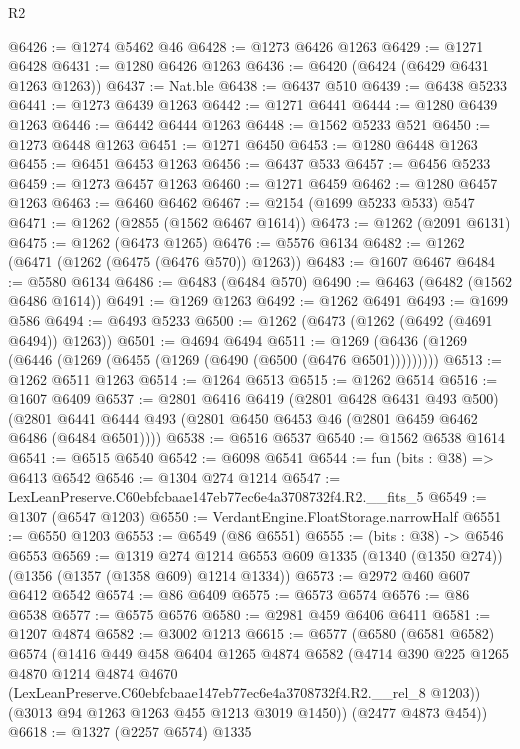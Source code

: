 \begin{lexlean}{R2}
\begin{coremodule}
@6426 := @1274 @5462 @46
@6428 := @1273 @6426 @1263
@6429 := @1271 @6428
@6431 := @1280 @6426 @1263
@6436 := @6420 (@6424 (@6429 @6431 @1263 @1263))
@6437 := Nat.ble
@6438 := @6437 @510
@6439 := @6438 @5233
@6441 := @1273 @6439 @1263
@6442 := @1271 @6441
@6444 := @1280 @6439 @1263
@6446 := @6442 @6444 @1263
@6448 := @1562 @5233 @521
@6450 := @1273 @6448 @1263
@6451 := @1271 @6450
@6453 := @1280 @6448 @1263
@6455 := @6451 @6453 @1263
@6456 := @6437 @533
@6457 := @6456 @5233
@6459 := @1273 @6457 @1263
@6460 := @1271 @6459
@6462 := @1280 @6457 @1263
@6463 := @6460 @6462
@6467 := @2154 (@1699 @5233 @533) @547
@6471 := @1262 (@2855 (@1562 @6467 @1614))
@6473 := @1262 (@2091 @6131)
@6475 := @1262 (@6473 @1265)
@6476 := @5576 @6134
@6482 := @1262 (@6471 (@1262 (@6475 (@6476 @570)) @1263))
@6483 := @1607 @6467
@6484 := @5580 @6134
@6486 := @6483 (@6484 @570)
@6490 := @6463 (@6482 (@1562 @6486 @1614))
@6491 := @1269 @1263
@6492 := @1262 @6491
@6493 := @1699 @586
@6494 := @6493 @5233
@6500 := @1262 (@6473 (@1262 (@6492 (@4691 @6494)) @1263))
@6501 := @4694 @6494
@6511 := @1269 (@6436 (@1269 (@6446 (@1269 (@6455 (@1269 (@6490 (@6500 (@6476 @6501)))))))))
@6513 := @1262 @6511 @1263
@6514 := @1264 @6513
@6515 := @1262 @6514
@6516 := @1607 @6409
@6537 := @2801
    @6416
    @6419
    (@2801 @6428 @6431 @493 @500)
    (@2801 @6441 @6444 @493 (@2801 @6450 @6453 @46 (@2801 @6459 @6462 @6486 (@6484 @6501))))
@6538 := @6516 @6537
@6540 := @1562 @6538 @1614
@6541 := @6515 @6540
@6542 := @6098 @6541
@6544 := fun (bits : @38) => @6413 @6542
@6546 := @1304 @274 @1214
@6547 := LexLeanPreserve.C60ebfcbaae147eb77ec6e4a3708732f4.R2.__fits_5
@6549 := @1307 (@6547 @1203)
@6550 := VerdantEngine.FloatStorage.narrowHalf
@6551 := @6550 @1203
@6553 := @6549 (@86 @6551)
@6555 := (bits : @38) -> @6546 @6553
@6569 := @1319
    @274
    @1214
    @6553
    @609
    @1335
    (@1340 (@1350 @274))
    (@1356 (@1357 (@1358 @609) @1214 @1334))
@6573 := @2972 @460 @607 @6412 @6542
@6574 := @86 @6409
@6575 := @6573 @6574
@6576 := @86 @6538
@6577 := @6575 @6576
@6580 := @2981 @459 @6406 @6411
@6581 := @1207 @4874
@6582 := @3002 @1213
@6615 := @6577
    (@6580
      (@6581 @6582)
      @6574
      (@1416
        @449
        @458
        @6404
        @1265
        @4874
        @6582
        (@4714
          @390
          @225
          @1265
          @4870
          @1214
          @4874
          @4670
          (LexLeanPreserve.C60ebfcbaae147eb77ec6e4a3708732f4.R2.__rel_8 @1203))
        (@3013 @94 @1263 @1263 @455 @1213 @3019 @1450))
      (@2477 @4873 @454))
@6618 := @1327 (@2257 @6574) @1335

\end{coremodule}
\end{lexlean}
